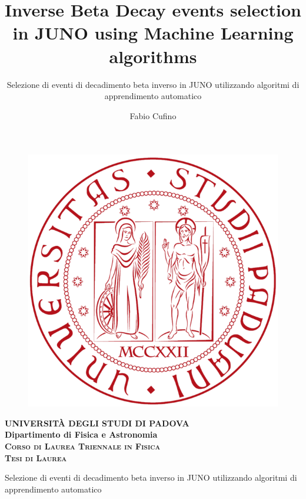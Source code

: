 \documentclass[a4paper,12pt]{memoir} %
\title{\textbf{Inverse Beta Decay events selection in JUNO using Machine Learning algorithms} \\}
\subtitle{Selezione di eventi di decadimento beta inverso in JUNO utilizzando algoritmi di apprendimento automatico}
\author{Fabio Cufino}
\begin{document}
  \frontmatter
  \begin{titlingpage} %
    \vspace{5mm}
    \begin{figure}[ht]
      \centering
      \includegraphics[scale=.13]{Images/logo.png}
    \end{figure}
    \vspace{5mm}
    \begin{center}
      {{\Large{\textsc{\textbf{UNIVERSITÀ DEGLI STUDI DI PADOVA}}}}\\}
      \vspace{5mm}
      {\textbf{Dipartimento di Fisica e Astronomia}} \\ %
      \vspace{5mm}
      {\textsc{\textbf{Corso di Laurea Triennale in Fisica}}}\\ %
      \vspace{20mm}
      {\textsc{\textbf{Tesi di Laurea}}}\\ %
      \vspace{25mm}
      \begin{Spacing}{2}
        {\Large \thetitle}
      \end{Spacing}
        \begin{Spacing}{1}{Selezione di eventi di decadimento beta inverso in JUNO utilizzando algoritmi di apprendimento automatico}
  \end{Spacing}
      \vspace{7mm}
    \end{center}


\end{titlingpage}
\end{document}
